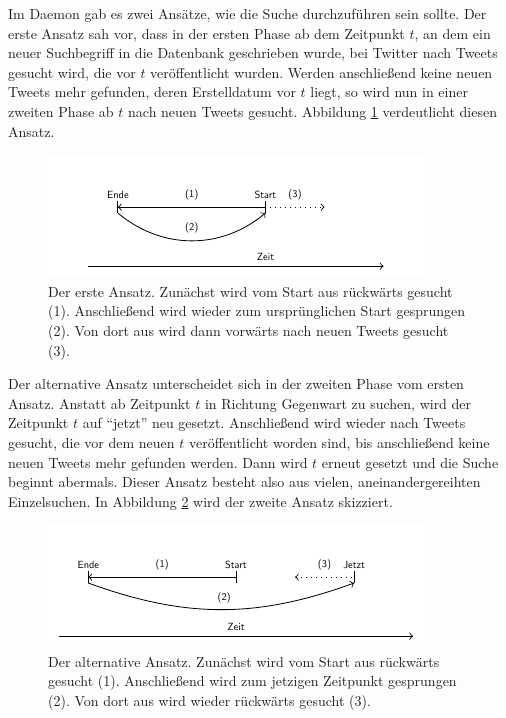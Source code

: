 Im Daemon gab es zwei Ansätze, wie die Suche durchzuführen sein sollte.
Der erste Ansatz sah vor, dass in der ersten Phase ab dem Zeitpunkt $t$, an dem ein neuer Suchbegriff in die Datenbank geschrieben wurde, bei Twitter nach Tweets gesucht wird, die vor $t$ veröffentlicht wurden.
Werden anschließend keine neuen Tweets mehr gefunden, deren Erstelldatum vor $t$ liegt, so wird nun in einer zweiten Phase ab $t$ nach neuen Tweets gesucht.
Abbildung \ref{fig:search_1} verdeutlicht diesen Ansatz.

\begin{figure}
\centering
\includegraphics[width=\textwidth]{Bilder/Daemon/SearchStrategy1.pdf}
\caption{Der erste Ansatz. Zunächst wird vom Start aus rückwärts gesucht (1). Anschließend wird wieder zum ursprünglichen Start gesprungen (2). Von dort aus wird dann vorwärts nach neuen Tweets gesucht (3).\label{fig:search_1}}
\end{figure}

Der alternative Ansatz unterscheidet sich in der zweiten Phase vom ersten Ansatz.
Anstatt ab Zeitpunkt $t$ in Richtung Gegenwart zu suchen, wird der Zeitpunkt $t$ auf "`jetzt"' neu gesetzt.
Anschließend wird wieder nach Tweets gesucht, die vor dem neuen $t$ veröffentlicht worden sind, bis anschließend keine neuen Tweets mehr gefunden werden.
Dann wird $t$ erneut gesetzt und die Suche beginnt abermals.
Dieser Ansatz besteht also aus vielen, aneinandergereihten Einzelsuchen.
In Abbildung \ref{fig:search_2} wird der zweite Ansatz skizziert.

\begin{figure}
\centering
\includegraphics[width=\textwidth]{Bilder/Daemon/SearchStrategy2.pdf}
\caption{Der alternative Ansatz. Zunächst wird vom Start aus rückwärts gesucht (1). Anschließend wird zum jetzigen Zeitpunkt gesprungen (2). Von dort aus wird wieder rückwärts gesucht (3).\label{fig:search_2}}
\end{figure}

